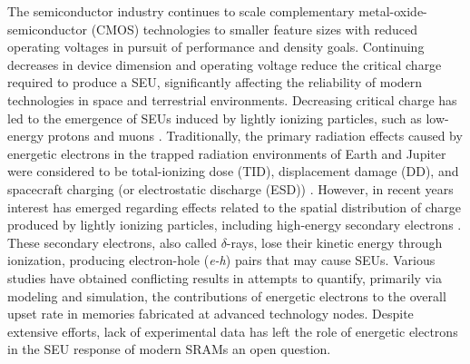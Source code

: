 The semiconductor industry continues to scale complementary metal-oxide-semiconductor (CMOS) technologies to smaller feature sizes with reduced operating voltages in pursuit of performance and density goals.
Continuing decreases in device dimension and operating voltage reduce the critical charge required to produce a SEU, significantly affecting the reliability of modern technologies in space and terrestrial environments. 
Decreasing critical charge has led to the emergence of SEUs induced by lightly ionizing particles, such as low-energy protons and muons \cite{Rodbell:2007vl, Sierawski:2010cj}. 
Traditionally, the primary radiation effects caused by energetic electrons in the trapped radiation environments of Earth and Jupiter were considered to be total-ionizing dose (TID), displacement damage (DD), and spacecraft charging (or electrostatic discharge (ESD)) \cite{Bourdarie:kj, Xapsos:2013cu}. 
However, in recent years interest has emerged regarding effects related to the spatial distribution of charge produced by lightly ionizing particles, including high-energy secondary electrons \cite{Weller:2003je, Raine:2010cna, Raine:gk, Raine:2012gi, King:2010cu, King:2012cb, Barak:2012im}. 
These secondary electrons, also called $\delta$-rays, lose their kinetic energy through ionization, producing electron-hole (\emph{e-h}) pairs that may cause SEUs. 
Various studies \cite{Weller:2003je, Raine:2010cna, Raine:gk, Raine:2012gi, King:2010cu, King:2012cb, Barak:2012im} have obtained conflicting results in attempts to quantify, primarily via modeling and simulation, the contributions of energetic electrons to the overall upset rate in memories fabricated at advanced technology nodes. 
Despite extensive efforts, lack of experimental data has left the role of energetic electrons in the SEU response of modern SRAMs an open question.

